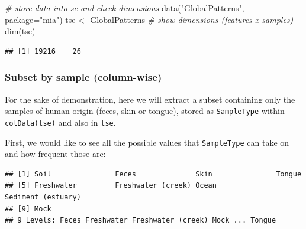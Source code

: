 \documentclass[
]{book}
\newenvironment{Shaded}{\begin{snugshade}}{\end{snugshade}}
\newcommand{\AttributeTok}[1]{\textcolor[rgb]{0.77,0.63,0.00}{#1}}
\newcommand{\CommentTok}[1]{\textcolor[rgb]{0.56,0.35,0.01}{\textit{#1}}}
\newcommand{\FunctionTok}[1]{\textcolor[rgb]{0.00,0.00,0.00}{#1}}
\newcommand{\NormalTok}[1]{#1}
\newcommand{\OtherTok}[1]{\textcolor[rgb]{0.56,0.35,0.01}{#1}}
\newcommand{\SpecialCharTok}[1]{\textcolor[rgb]{0.00,0.00,0.00}{#1}}
\newcommand{\StringTok}[1]{\textcolor[rgb]{0.31,0.60,0.02}{#1}}
\begin{document}
\begin{Shaded}
\begin{Highlighting}[]
\CommentTok{\# store data into se and check dimensions}
\FunctionTok{data}\NormalTok{(}\StringTok{"GlobalPatterns"}\NormalTok{, }\AttributeTok{package=}\StringTok{"mia"}\NormalTok{)}
\NormalTok{tse }\OtherTok{\textless{}{-}}\NormalTok{ GlobalPatterns}
\CommentTok{\# show dimensions (features x samples)}
\FunctionTok{dim}\NormalTok{(tse) }
\end{Highlighting}
\end{Shaded}

\begin{verbatim}
## [1] 19216    26
\end{verbatim}

\hypertarget{subset-by-sample-column-wise}{%
\subsubsection{Subset by sample (column-wise)}\label{subset-by-sample-column-wise}}

For the sake of demonstration, here we will extract a subset containing only the samples of human origin (feces, skin or tongue), stored as \texttt{SampleType} within \texttt{colData(tse)} and also in \texttt{tse}.

First, we would like to see all the possible values that \texttt{SampleType} can take on and how frequent those are:

\begin{Shaded}
\end{Shaded}

\begin{verbatim}
## [1] Soil               Feces              Skin               Tongue            
## [5] Freshwater         Freshwater (creek) Ocean              Sediment (estuary)
## [9] Mock              
## 9 Levels: Feces Freshwater Freshwater (creek) Mock ... Tongue
\end{verbatim}

\begin{Shaded}
\end{Shaded}
\end{document}
